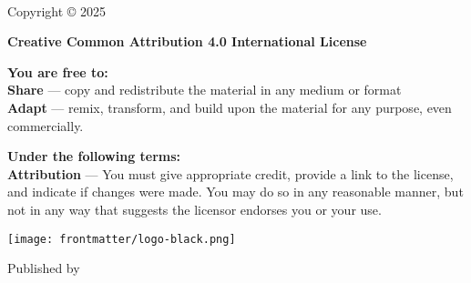 
{\small
\setlength{\parindent}{0em}\setlength{\parskip}{1em}
~
\vfill

Copyright \copyright{} 2025 \website

\textbf{Creative Common Attribution 4.0 International License}

\textbf{You are free to:} \\
\textbf{Share} — copy and redistribute the material in any medium or format \\
\textbf{Adapt} — remix, transform, and build upon the material for any purpose, even commercially.

\textbf{Under the following terms:} \\
\textbf{Attribution} — You must give appropriate credit, provide a link to the license, and indicate if changes were made. You may do so in any reasonable manner, but not in any way that suggests the licensor endorses you or your use.


\ifx\isbn\undefined\else\if\relax\detokenize\expandafter{\isbn}\relax{}\fi\fi

\texttt{[image: frontmatter/logo-black.png]}

Published by \publisher{}
}
